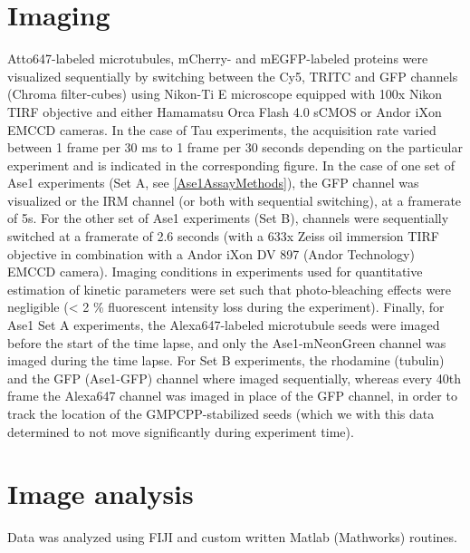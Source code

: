 \section{Imaging}
Atto647-labeled microtubules, mCherry- and mEGFP-labeled proteins were visualized sequentially by switching between the Cy5, TRITC and GFP channels (Chroma filter-cubes) using Nikon-Ti E microscope equipped with 100x Nikon TIRF objective and either Hamamatsu Orca Flash 4.0 sCMOS or Andor iXon EMCCD cameras. In the case of Tau experiments, the acquisition rate varied between 1 frame per 30 ms to 1 frame per 30 seconds depending on the particular experiment and is indicated in the corresponding figure. In the case of one set of Ase1 experiments (Set A, see \autoref{Ase1AssayMethods}), the GFP channel was visualized or the IRM channel (or both with sequential switching), at a framerate of 5s. For the other set of Ase1 experiments (Set B), channels were sequentially switched at a framerate of 2.6 seconds (with a 633x Zeiss oil immersion TIRF objective in combination with a Andor iXon DV 897 (Andor Technology) EMCCD camera). Imaging conditions in experiments used for quantitative estimation of kinetic parameters were set such that photo-bleaching effects were negligible (< 2 \% fluorescent intensity loss during the experiment). Finally, for Ase1 Set A experiments, the Alexa647-labeled microtubule seeds were imaged before the start of the time lapse, and only the Ase1-mNeonGreen channel was imaged during the time lapse. For Set B experiments, the rhodamine (tubulin) and the GFP (Ase1-GFP) channel where imaged sequentially, whereas every 40th frame the Alexa647 channel was imaged in place of the GFP channel, in order to track the location of the GMPCPP-stabilized seeds (which we with this data determined to not move significantly during experiment time). 

\section{Image analysis}
\label{methods_analysis}
Data was analyzed using FIJI \parencite{Schindelin2012} and custom written Matlab (Mathworks) routines. 
